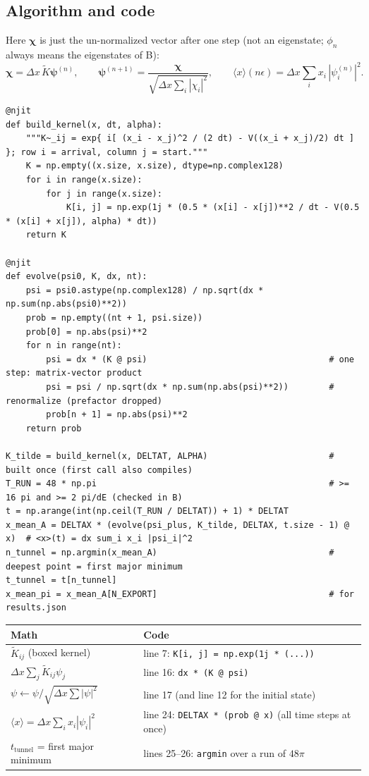 \documentclass[10pt]{article}
\newcommand{\code}[1]{\texttt{#1}}
\begin{document}
\subsection{Algorithm and code}
Here $\boldsymbol\chi$ is just the un-normalized vector after one step (not an eigenstate; $\phi_n$ always means the eigenstates of B):
\[
\boldsymbol\chi=\Delta x\,\tilde K\boldsymbol\psi^{(n)},\qquad\boldsymbol\psi^{(n+1)}=\frac{\boldsymbol\chi}{\sqrt{\Delta x\sum_i|\chi_i|^2}},\qquad\langle x\rangle(n\epsilon)=\Delta x\sum_ix_i\,|\psi_i^{(n)}|^2 .
\]
\begin{lstlisting}[firstnumber=1]
@njit
def build_kernel(x, dt, alpha):
    """K~_ij = exp{ i[ (x_i - x_j)^2 / (2 dt) - V((x_i + x_j)/2) dt ] }; row i = arrival, column j = start."""
    K = np.empty((x.size, x.size), dtype=np.complex128)
    for i in range(x.size):
        for j in range(x.size):
            K[i, j] = np.exp(1j * (0.5 * (x[i] - x[j])**2 / dt - V(0.5 * (x[i] + x[j]), alpha) * dt))
    return K

@njit
def evolve(psi0, K, dx, nt):
    psi = psi0.astype(np.complex128) / np.sqrt(dx * np.sum(np.abs(psi0)**2))
    prob = np.empty((nt + 1, psi.size))
    prob[0] = np.abs(psi)**2
    for n in range(nt):
        psi = dx * (K @ psi)                                    # one step: matrix-vector product
        psi = psi / np.sqrt(dx * np.sum(np.abs(psi)**2))        # renormalize (prefactor dropped)
        prob[n + 1] = np.abs(psi)**2
    return prob

K_tilde = build_kernel(x, DELTAT, ALPHA)                        # built once (first call also compiles)
T_RUN = 48 * np.pi                                              # >= 16 pi and >= 2 pi/dE (checked in B)
t = np.arange(int(np.ceil(T_RUN / DELTAT)) + 1) * DELTAT
x_mean_A = DELTAX * (evolve(psi_plus, K_tilde, DELTAX, t.size - 1) @ x)  # <x>(t) = dx sum_i x_i |psi_i|^2
n_tunnel = np.argmin(x_mean_A)                                  # deepest point = first major minimum
t_tunnel = t[n_tunnel]
x_mean_pi = x_mean_A[N_EXPORT]                                  # for results.json
\end{lstlisting}
\begin{center}\small
\begin{tabular}{@{}ll@{}}
\toprule
\textbf{Math} & \textbf{Code}\\
\midrule
$\tilde K_{ij}$ (boxed kernel) & line 7: \code{K[i, j] = np.exp(1j * (...))}\\
$\Delta x\sum_j\tilde K_{ij}\psi_j$ & line 16: \code{dx * (K @ psi)}\\
$\psi\leftarrow\psi/\sqrt{\Delta x\sum|\psi|^2}$ & line 17 (and line 12 for the initial state)\\
$\langle x\rangle=\Delta x\sum_ix_i|\psi_i|^2$ & line 24: \code{DELTAX * (prob @ x)} (all time steps at once)\\
$t_\text{tunnel}$ = first major minimum & lines 25--26: \code{argmin} over a run of $48\pi$\\
\bottomrule
\end{tabular}
\end{center}
\end{document}
